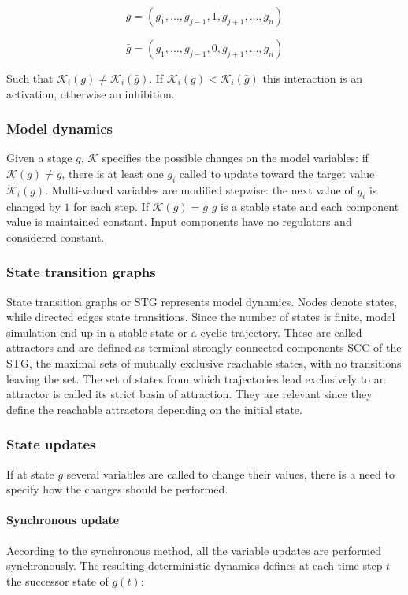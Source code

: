     $$g = (g_1, \dots, g_{j-1}, 1, g_{j+1}, \dots, g_n)$$

    $$\bar{g} = (g_1, \dots, g_{j-1}, 0, g_{j+1}, \dots, g_n)$$

    Such that $\mathcal{K}_i(g)\neq\mathcal{K}_i(\bar{g})$.
    If $\mathcal{K}_i(g)<\mathcal{K}_i(\bar{g})$ this interaction is an activation, otherwise an inhibition.

    \subsubsection{Model dynamics}
    Given a stage $g$, $\mathcal{K}$ specifies the possible changes on the model variables: if $\mathcal{K}(g)\neq g$, there is at least one $g_i$ called to update toward the target value $\mathcal{K}_i(g)$.
    Multi-valued variables are modified stepwise: the next value of $g_i$ is changed by $1$ for each step.
    If $\mathcal{K}(g) = g$ $g$ is a stable state and each component value is maintained constant.
    Input components have no regulators and considered constant.

    \subsubsection{State transition graphs}
    State transition graphs or STG represents model dynamics.
    Nodes denote states, while directed edges state transitions.
    Since the number of states is finite, model simulation end up in a stable state or a cyclic trajectory.
    These are called attractors and are defined as terminal strongly connected components SCC of the STG, the maximal sets of mutually exclusive reachable states, with no transitions leaving the set.
    The set of states from which trajectories lead exclusively to an attractor is called its strict basin of attraction.
    They are relevant since they define the reachable attractors depending on the initial state.

    \subsubsection{State updates}
    If at state $g$ several variables are called to change their values, there is a need to specify how the changes should be performed.

    \paragraph{Synchronous update}
    According to the synchronous method, all the variable updates are performed synchronously.
    The resulting deterministic dynamics defines at each time step $t$ the successor state of $g(t)$:

